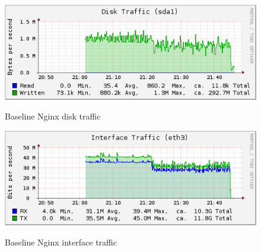 \documentclass[Measurements]{subfiles}
\begin{document}
\begin{figure}[H]
\centering
\caption{Baseline Nginx disk traffic}
\includegraphics[scale=0.7]{images/results/200_with_naxsi_core_rules_configured/disk.png}
\label{fig:Baseline Nginx disk traffic}
\end{figure}

\begin{figure}[H]
\centering
\caption{Baseline Nginx interface traffic}
\includegraphics[scale=0.7]{images/results/200_with_naxsi_core_rules_configured/interface.png}
\label{fig:Baseline Nginx interface traffic}
\end{figure}
\end{document}
